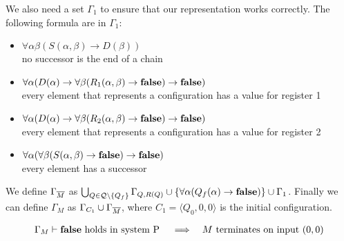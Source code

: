 We also need a set $\Gamma_1$ to ensure that our representation works correctly. The following formula are in $\Gamma_1$:
\begin{itemize}
	\item $\forall\alpha\beta(S(\alpha,\beta)\to D(\beta))$\\no successor is the end of a chain
	\item $\forall\alpha(D(\alpha)\to\forall\beta(R_1(\alpha,\beta)\to\textbf{false})\to\textbf{false})$\\every element that represents a configuration has a value for register 1
	\item $\forall\alpha(D(\alpha)\to\forall\beta(R_2(\alpha,\beta)\to\textbf{false})\to\textbf{false})$\\every element that represents a configuration has a value for register 2
	\item $\forall\alpha(\forall\beta(S(\alpha,\beta)\to\textbf{false})\to\textbf{false})$\\every element has a successor
\end{itemize}
We define $\Gamma_{\overline{M}}$ as $\bigcup_{Q\in\mathcal{Q}\setminus\{Q_f\}}\Gamma_{Q,R(Q)}\cup\{\forall\alpha(Q_f(\alpha)\to\textbf{false})\}\cup\Gamma_1$.
Finally we can define $\Gamma_M$ as $\Gamma_{C_1}\cup\Gamma_{\overline{M}}$, where $C_1=\langle Q_0,0,0\rangle$ is the initial configuration.
\begin{claim}\label{cla.17}
	\begin{align*}
		  & \text{$\Gamma_M\vdash\textbf{false}$ holds in system P} &   & \implies & \text{$M$ terminates on input $(0,0)$} 
	\end{align*}
\end{claim}
